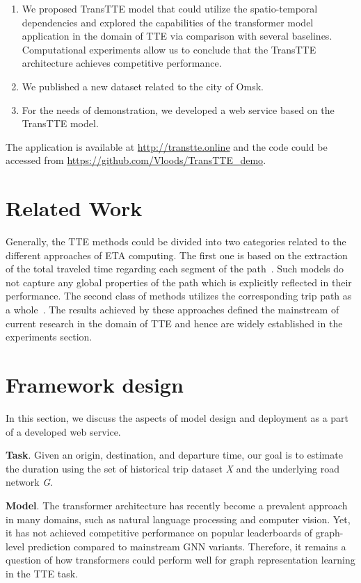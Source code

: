 \documentclass{svproc}
\begin{document}
\begin{enumerate}
    \item We proposed TransTTE model that could utilize the spatio-temporal dependencies and explored the capabilities of the transformer model application in the domain of TTE via comparison with several baselines. Computational experiments allow us to conclude that the TransTTE architecture achieves competitive performance. 
    \item We published a new dataset related to the city of Omsk.  
    \item For the needs of demonstration, we developed a web service based on the TransTTE model.
\end{enumerate}

The application is available at \url{http://transtte.online} and the code could be accessed from \url{https://github.com/Vloods/TransTTE_demo}.

\section{Related Work}
Generally, the TTE methods could be divided into two categories related to the different approaches of ETA computing. The first one is based on the extraction of the total traveled time regarding each segment of the path~\cite{example:segment_1}. Such models do not capture any global properties of the path which is explicitly reflected in their performance. The second class of methods utilizes the corresponding trip path as a whole~\cite{STGNN-TTE}. The results achieved by these approaches defined the mainstream of current research in the domain of TTE and hence are widely established in the experiments section.

\section{Framework design}
In this section, we discuss the aspects of model design and deployment as a part of a developed web service.  

\textbf{Task}. Given an origin, destination, and departure time, our goal is to estimate the duration using the set of historical trip dataset \textit{X} and the underlying road network \textit{G}.




\textbf{Model}. The transformer architecture has recently become a prevalent approach in many domains, such as natural language processing and computer vision. Yet, it has not achieved competitive performance on popular leaderboards of graph-level prediction compared to mainstream GNN variants. Therefore, it remains a question of how transformers could perform well for graph representation learning in the TTE task. 
\end{document}
